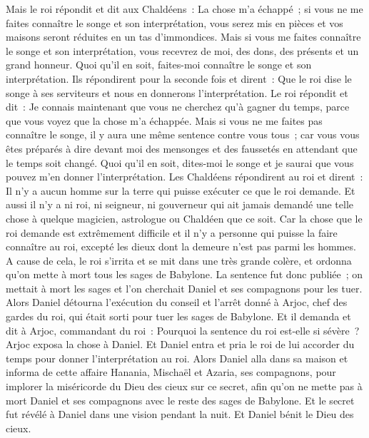 \begin{multicols}{2}
Mais le roi répondit et dit aux Chaldéens~: La chose m'a échappé~; si vous ne me faites connaître le songe et son interprétation, vous serez mis en pièces et vos maisons seront réduites en un tas d'immondices.
Mais si vous me faites connaître le songe et son interprétation, vous recevrez de moi, des dons, des présents et un grand honneur. Quoi qu'il en soit, faites-moi connaître le songe et son interprétation.
Ils répondirent pour la seconde fois et dirent~: Que le roi dise le songe à ses serviteurs et nous en donnerons l'interprétation.
Le roi répondit et dit~: Je connais maintenant que vous ne cherchez qu'à gagner du temps, parce que vous voyez que la chose m'a échappée.
Mais si vous ne me faites pas connaître le songe, il y aura une même sentence contre vous tous~; car vous vous êtes préparés à dire devant moi des mensonges et des faussetés en attendant que le temps soit changé. Quoi qu'il en soit, dites-moi le songe et je saurai que vous pouvez m'en donner l'interprétation.
Les Chaldéens répondirent au roi et dirent~: Il n'y a aucun homme sur la terre qui puisse exécuter ce que le roi demande. Et aussi il n'y a ni roi, ni seigneur, ni gouverneur qui ait jamais demandé une telle chose à quelque magicien, astrologue ou Chaldéen que ce soit.
Car la chose que le roi demande est extrêmement difficile et il n'y a personne qui puisse la faire connaître au roi, excepté les dieux dont la demeure n'est pas parmi les hommes.
A cause de cela, le roi s'irrita et se mit dans une très grande colère, et ordonna qu'on mette à mort tous les sages de Babylone.
La sentence fut donc publiée~; on mettait à mort les sages et l'on cherchait Daniel et ses compagnons pour les tuer.
Alors Daniel détourna l'exécution du conseil et l'arrêt donné à Arjoc, chef des gardes du roi, qui était sorti pour tuer les sages de Babylone.
Et il demanda et dit à Arjoc, commandant du roi~: Pourquoi la sentence du roi est-elle si sévère~? Arjoc exposa la chose à Daniel.
Et Daniel entra et pria le roi de lui accorder du temps pour donner l'interprétation au roi.
Alors Daniel alla dans sa maison et informa de cette affaire Hanania, Mischaël et Azaria, ses compagnons,
pour implorer la miséricorde du Dieu des cieux sur ce secret, afin qu'on ne mette pas à mort Daniel et ses compagnons avec le reste des sages de Babylone. 
Et le secret fut révélé à Daniel dans une vision pendant la nuit. Et Daniel bénit le Dieu des cieux.

\end{multicols}
